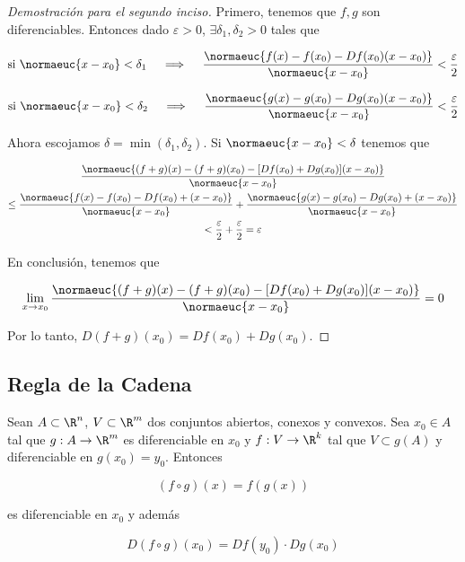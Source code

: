\begin{proof}[Demostración para el segundo inciso]
    Primero, tenemos que $f, g$ son diferenciables. Entonces dado $\varepsilon > 0$, $\exists \delta_1, \delta_2 > 0$ tales que
    
    \[
    \text{si $\normaeuc{x - x_0} < \delta_1$} \quad \implies \quad \dfrac{\normaeuc{f(x) - f(x_0) - Df(x_0)(x-x_0)}}{\normaeuc{x-x_0}} < \frac{\varepsilon}{2}
    \]
    
    \[
    \text{si $\normaeuc{x - x_0} < \delta_2$} \quad \implies \quad \dfrac{\normaeuc{g(x) - g(x_0) - Dg(x_0)(x-x_0)}}{\normaeuc{x-x_0}} < \frac{\varepsilon}{2}
    \]
    
    Ahora escojamos $\delta = \min(\delta_1, \delta_2)$. Si $\normaeuc{x - x_0} < \delta$ tenemos que
    
    \begin{gather*}
        \dfrac{\normaeuc{(f+g)(x) - (f+g)(x_0) - [Df(x_0) + Dg(x_0)](x-x_0)}}{\normaeuc{x-x_0}} \\
            \leq \dfrac{\normaeuc{f(x) - f(x_0) - Df(x_0) + (x-x_0)}}{\normaeuc{x-x_0}} + \dfrac{\normaeuc{g(x) - g(x_0) - Dg(x_0) + (x-x_0)}}{\normaeuc{x-x_0}} \\
            < \frac{\varepsilon}{2} + \frac{\varepsilon}{2} = \varepsilon
    \end{gather*}
    
    En conclusión, tenemos que
    
    \[
    \lim_{x \to x_0} \dfrac{\normaeuc{(f+g)(x) - (f+g)(x_0) - [Df(x_0) + Dg(x_0)](x-x_0)}}{\normaeuc{x-x_0}} = 0
    \]
    
    Por lo tanto, $D(f+g)(x_0) = Df(x_0) + Dg(x_0)$.
\end{proof}

\subsection{Regla de la Cadena}

\begin{teo}\label{teo:rcadena}
    Sean $A \subset \R^n$, $V \subset \R^m$ dos conjuntos abiertos, conexos y convexos. Sea $x_0 \in A$ tal que $g: A \rightarrow \R^m$ es diferenciable en $x_0$ y $f: V \rightarrow \R^k$ tal que $V \subset g(A)$ y diferenciable en $g(x_0) = y_0$. Entonces
    
    \[
    (f \circ g)(x) = f(g(x))
    \]
    
    \noindent es diferenciable en $x_0$ y además
    
    \[
    D(f \circ g)(x_0) = Df(y_0) \cdot Dg(x_0)
    \]
\end{teo}

